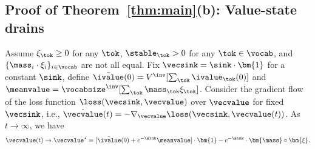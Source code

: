 \subsection{Proof of Theorem~\ref{thm:main}(b): Value-state drains}\label{appsec:proof-main-2}
\begin{theorem}\label{appthm:main-3}
Assume $\xi_\tok \ge 0$ for any $\tok$, $\stable_\tok > 0$ for any $\tok\in\vocab$, and $\{ \mass_i \cdot \xi_i \}_{i \in \vocab}$ are not all equal. Fix $\vecsink = \sink \cdot \bm{1}$ for a constant $\sink$, define $\bar{\ivalue}(0) = V^\inv[\sum_{\tok} \ivalue_\tok(0)]$ and $\meanvalue=\vocabsize^\inv[\sum_{\tok} \mass_\tok \xi_\tok]$. Consider the gradient flow of the loss function $\loss(\vecsink, \vecvalue)$ over $\vecvalue$ for fixed $\vecsink$, i.e., $\dot{\vecvalue}(t) = - \nabla_{\vecvalue} \loss(\vecsink, \vecvalue(t))$. As $t \to \infty$, we have
    \begin{equation}\vecvalue(t) \to \vecvalue^\star = [\bar\ivalue(0)+e^{-\sink} \meanvalue] \cdot \bm{1} - e^{-\sink} \cdot \bm{\mass}\circ \bm{\xi}.\end{equation}
\end{theorem}
